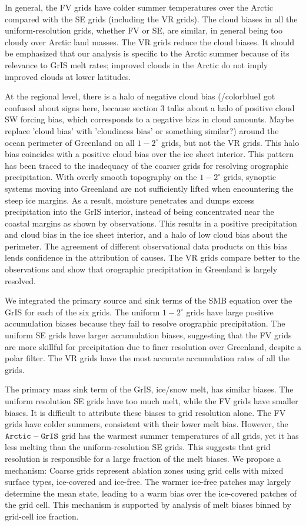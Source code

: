 \documentclass[draft]{agujournal2019}
\begin{document}
In general, the FV grids have colder summer temperatures over the Arctic compared with the SE grids (including the VR grids). The cloud biases in all the uniform-resolution grids, whether FV or SE, are similar, in general being too cloudy over Arctic land masses. The VR grids reduce the cloud biases. It should be emphasized that our analysis is specific to the Arctic summer because of its relevance to GrIS melt rates; improved clouds in the Arctic do not imply improved clouds at lower latitudes.

At the regional level, there is a halo of negative cloud bias (/color{blue}{I got confused about signs here, because section 3 talks about a halo of positive cloud SW forcing bias, which corresponds to a negative bias in cloud amounts.  Maybe replace 'cloud bias' with 'cloudiness bias' or something similar?}) around the ocean perimeter of Greenland on all $1-2^{\circ}$ grids, but not the VR grids. This halo bias coincides with a positive cloud bias over the ice sheet interior. This pattern has been traced to the inadequacy of the coarser grids for resolving orographic precipitation.  With overly smooth topography on the $1-2^{\circ}$ grids, synoptic systems moving into Greenland are not sufficiently lifted when encountering the steep ice margins.
As a result, moisture penetrates and dumps excess precipitation into the GrIS interior, instead of being concentrated near the coastal margins as shown by observations. This results in a positive precipitation and cloud bias in the ice sheet interior, and a halo of low cloud bias about the perimeter. The agreement of different observational data products on this bias lends confidence in the attribution of causes.
The VR grids compare better to the observations and show that orographic precipitation in Greenland is largely resolved.

We integrated the primary source and sink terms of the SMB equation over the GrIS for each of the six grids. The uniform $1-2^{\circ}$ grids have large positive accumulation biases because they fail to resolve orographic precipitation. The uniform SE grids have larger accumulation biases, suggesting that the FV grids are more skillful for precipitation due to finer resolution over Greenland, despite a polar filter. The VR grids have the most accurate accumulation rates of all the grids. 

The primary mass sink term of the GrIS, ice/snow melt, has similar biases. The uniform resolution SE grids have too much melt, while the FV grids have smaller biases. It is difficult to attribute these biases to grid resolution alone.  The FV grids have colder summers, consistent with their lower melt bias. However, the $\tt Arctic-GrIS$ grid has the warmest summer temperatures of all grids, yet it has less melting than the uniform-resolution SE grids. This suggests that grid resolution is responsible for a large fraction of the melt biases. We propose a mechanism: Coarse grids represent ablation zones using grid cells with mixed surface types, ice-covered and ice-free.  The warmer ice-free patches may largely determine the mean state, leading to a warm bias over the ice-covered patches of the grid cell. This mechanism is supported by analysis of melt biases binned by grid-cell ice fraction. 
\end{document}

